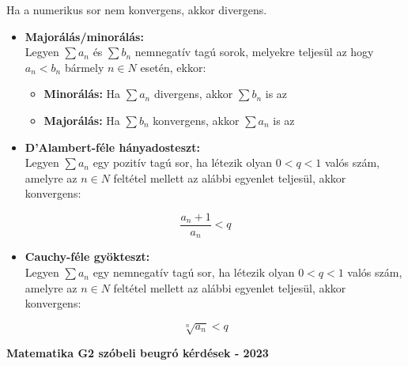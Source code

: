 \documentclass[11pt,a4paper]{article}
\begin{document}
\begin{tcolorbox}[colback=green!5!white,colframe=green!60!black,title= 3. Numerikus sor divergenciája]
    Ha a numerikus sor nem konvergens, akkor divergens.
\end{tcolorbox}

\begin{tcolorbox}[colback=green!5!white,colframe=green!60!black,title= 4. Konvergencia tesztek]
    \begin{itemize}
        \item \textbf{Majorálás/minorálás:}\\
        Legyen \(\sum a_n\) és \(\sum b_n\) nemnegatív tagú sorok, melyekre teljesül az hogy \(a_n < b_n\) bármely \(n \in N\)
        esetén, ekkor:
        \begin{itemize}
        \item \textbf{Minorálás:} Ha \(\sum a_n\) divergens, akkor \(\sum b_n\) is az
        \item \textbf{Majorálás:} Ha \(\sum b_n\) konvergens, akkor \(\sum a_n\) is az
        \end{itemize}
    \end{itemize}
    \begin{itemize}
        \item \textbf{D'Alambert-féle hányadosteszt:}\\
        Legyen \(\sum a_n\) egy pozitív tagú sor, ha létezik olyan \(0 < q < 1\) valós szám, amelyre az \(n \in N\) feltétel
mellett az alábbi egyenlet teljesül, akkor konvergens:
    \end{itemize}
    $$\frac{a_n +1}{a_n} < q$$
    \begin{itemize}
        \item \textbf{Cauchy-féle gyökteszt:}\\
        Legyen \(\sum a_n\) egy nemnegatív tagú sor, ha létezik olyan \(0 < q < 1\) valós szám, amelyre az \(n \in N\)
feltétel mellett az alábbi egyenlet teljesül, akkor konvergens:
    \end{itemize}
    $$\sqrt[n]{a_n} < q$$
\end{tcolorbox}

\newpage
\begin{center}
    \Large \textbf{Matematika G2 szóbeli beugró kérdések - 2023}
 \end{center}
\end{document}
